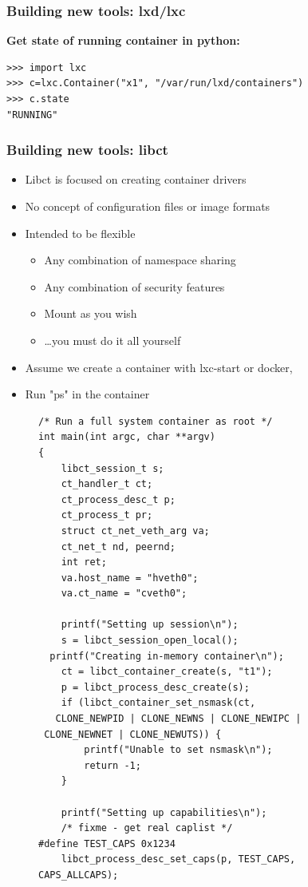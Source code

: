 \documentclass{beamer}
\begin{document}
\begin{frame}[fragile]
\frametitle{Building new tools: lxd/lxc}
{\bf Get state of running container in python:} \\
{\tiny
\begin{lstlisting}
>>> import lxc
>>> c=lxc.Container("x1", "/var/run/lxd/containers")
>>> c.state
"RUNNING"
\end{lstlisting}
}
\end{frame}

\begin{frame}
\frametitle{Building new tools: libct}
\begin{itemize}
\item Libct is focused on creating container drivers
\item No concept of configuration files or image formats
\item Intended to be flexible
  \begin{itemize}
  \item Any combination of namespace sharing
  \item Any combination of security features
  \item Mount as you wish
  \item \dots you must do it all yourself
  \end{itemize}
\item Assume we create a container with lxc-start or docker,
\item Run "ps" in the container
\end{itemize}
\end{frame}

\begin{frame}[fragile]
\begin{figure}
{\tiny
  \begin{lstlisting}
/* Run a full system container as root */
int main(int argc, char **argv)
{
	libct_session_t s;
	ct_handler_t ct;
	ct_process_desc_t p;
	ct_process_t pr;
	struct ct_net_veth_arg va;
	ct_net_t nd, peernd;
	int ret;
	va.host_name = "hveth0";
	va.ct_name = "cveth0";

	printf("Setting up session\n");
	s = libct_session_open_local();
  printf("Creating in-memory container\n");
	ct = libct_container_create(s, "t1");
	p = libct_process_desc_create(s);
	if (libct_container_set_nsmask(ct,
   CLONE_NEWPID | CLONE_NEWNS | CLONE_NEWIPC |
 CLONE_NEWNET | CLONE_NEWUTS)) {
		printf("Unable to set nsmask\n");
		return -1;
	}

	printf("Setting up capabilities\n");
	/* fixme - get real caplist */
#define TEST_CAPS 0x1234
	libct_process_desc_set_caps(p, TEST_CAPS, CAPS_ALLCAPS);
  \end{lstlisting}
}
\end{figure}
\end{frame}
\end{document}
